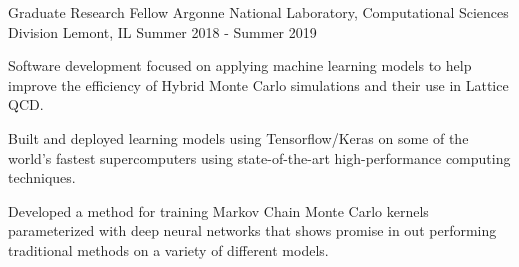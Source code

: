 \vspace{-1.75ex}

\begin{cventries}

\cventry
  {Graduate Research Fellow} %
  {Argonne National Laboratory, Computational Sciences Division} %
  {Lemont, IL} %
  {Summer 2018 - Summer 2019} %
  {
      \begin{cvitems} %
          \item {Software development focused on applying machine learning
                  models to help improve the efficiency of Hybrid Monte Carlo 
                simulations and their use in Lattice QCD.}
          \item {Built and deployed learning models using Tensorflow/Keras 
                  on some of the world's fastest supercomputers using 
                  state-of-the-art high-performance computing techniques.}
          \item {Developed a method for training Markov Chain Monte
                  Carlo kernels parameterized with deep neural networks that
                  shows promise in out performing traditional methods on a
                  variety of different models.}
      \end{cvitems}
  }


\end{cventries}
